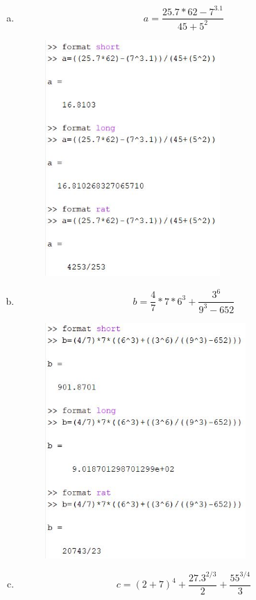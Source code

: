 \documentclass{article}
\begin{document}
\begin{enumerate}[a)]
    \item $$a = \frac{25.7 * 62 - 7^{3.1}}{45 + 5^2}$$
        \begin{figure}[H]
        \centering
        \includegraphics[height=9cm]{img7a.jpg}
        \end{figure}
    \item $$b = \frac{4}{7} * 7 * 6^3 + \frac{3^6}{9^3 - 652}$$
        \begin{figure}[H]
        \centering
        \includegraphics[height=9cm]{img7b.jpg}
        \end{figure}
    \item $$c = \left(2+7\right)^4 + \frac{27.3^{2/3}}{2} + \frac{55^{3/4}}{3}$$
        \begin{figure}[H]
        \centering

\end{figure}
\end{enumerate}
\end{document}
